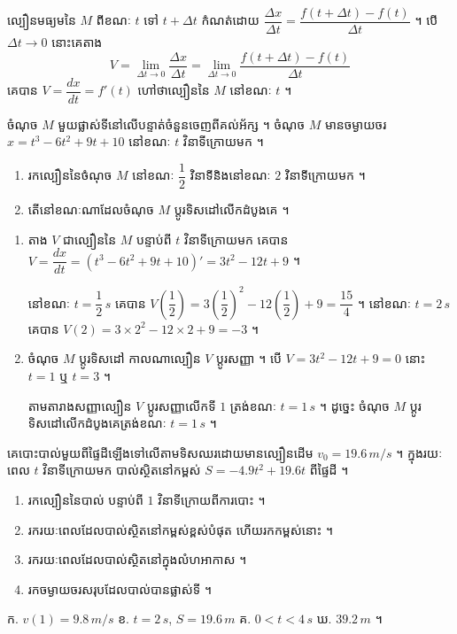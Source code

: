 ល្បឿនមធ្យមនៃ $M$ ពីខណៈ $t$ ទៅ $t + \Delta t$ កំណត់ដោយ $\dfrac{\Delta x}{\Delta t} = \dfrac{f(t + \Delta t) - f(t)}{\Delta t}$ ។ បើ $\Delta t \to 0$ នោះគេតាង
\[ V = \lim_{\Delta t \to 0}\frac{\Delta x}{\Delta t} = \lim_{\Delta t \to 0}\frac{f(t + \Delta t) - f(t)}{\Delta t} \]
គេបាន $V = \dfrac{dx}{dt} = f'(t)$ ហៅថាល្បឿននៃ $M$ នៅខណៈ $t$ ។

\begin{example}[លំហាត់គំរូ]
ចំណុច $M$ មួយផ្លាស់ទីនៅលើបន្ទាត់ចំនួនចេញពីគល់អ័ក្ស ។ ចំណុច $M$ មានចម្ងាយចរ $x = t^3 - 6t^2 + 9t + 10$ នៅខណៈ $t$ វិនាទីក្រោយមក ។
\begin{enumerate}[a]
  \item រកល្បឿននៃចំណុច $M$ នៅខណៈ $\dfrac{1}{2}$ វិនាទីនិងនៅខណៈ $2$ វិនាទីក្រោយមក ។
  \item តើនៅខណៈណាដែលចំណុច $M$ ប្ដូរទិសដៅលើកដំបូងគេ ។
\end{enumerate}
\end{example}
\ans
\begin{enumerate}[a]
  \item តាង $V$ ជាល្បឿននៃ $M$ បន្ទាប់ពី $t$ វិនាទីក្រោយមក គេបាន $V = \dfrac{dx}{dt} = (t^3 - 6t^2 + 9t + 10)' = 3t^2 - 12t + 9$ ។

  នៅខណៈ $t = \dfrac{1}{2}\,s$ គេបាន $V\left(\dfrac{1}{2}\right) = 3\left(\dfrac{1}{2}\right)^2 - 12\left(\dfrac{1}{2}\right) + 9 = \dfrac{15}{4}$ ។ នៅខណៈ $t = 2\,s$ គេបាន $V(2) = 3\times 2^2 - 12\times 2 + 9 = -3$ ។
  \item ចំណុច $M$ ប្ដូរទិសដៅ កាលណាល្បឿន $V$ ប្ដូរសញ្ញា ។ បើ $V = 3t^2 - 12t + 9 = 0$ នោះ $t = 1$ ឬ $t = 3$ ។
  \begin{center}
  \end{center}
  តាមតារាងសញ្ញាល្បឿន $V$ ប្ដូរសញ្ញាលើកទី $1$ ត្រង់ខណៈ $t = 1\,s$ ។ ដូច្នេះ ចំណុច $M$ ប្ដូរទិសដៅលើកដំបូងគេត្រង់ខណៈ $t = 1\,s$ ។
\end{enumerate}

\begin{pro}
គេបោះបាល់មួយពីផ្ទៃដីឡើងទៅលើតាមទិសឈរដោយមានល្បឿនដើម $v_0 = 19.6\,m/s$ ។ ក្នុងរយៈពេល $t$ វិនាទីក្រោយមក បាល់ស្ថិតនៅកម្ពស់ $S = -4.9t^2 + 19.6t$ ពីផ្ទៃដី ។
\begin{enumerate}[a]
  \item រកល្បឿននៃបាល់ បន្ទាប់ពី $1$ វិនាទីក្រោយពីការបោះ ។
  \item រករយៈពេលដែលបាល់ស្ថិតនៅកម្ពស់ខ្ពស់បំផុត ហើយរកកម្ពស់នោះ ។
  \item រករយៈពេលដែលបាល់ស្ថិតនៅក្នុងលំហអាកាស ។
  \item រកចម្ងាយចរសរុបដែលបាល់បានផ្លាស់ទី ។
\end{enumerate}
\ans
ក. $v(1) = 9.8\,m/s$ \quad ខ. $t = 2\,s$, $S = 19.6\,m$ \quad គ. $0 < t < 4\,s$ \quad ឃ. $39.2\,m$ ។
\end{pro}

